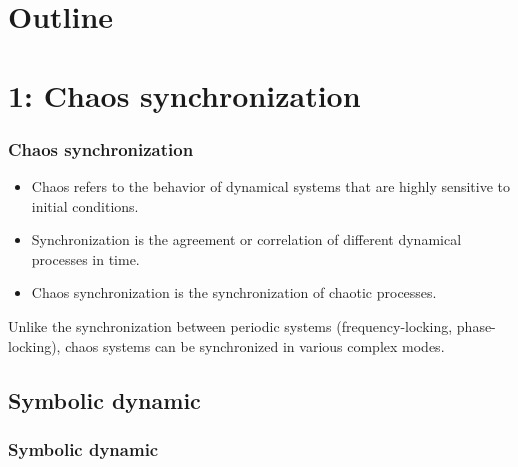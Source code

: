 \documentclass[14pt,handout]{beamer}
\begin{document}
\begin{CJK}{UTF8}{gbsn}
\section*{Outline}
\begin{frame}[shrink] %
\vspace{1cm}
\tableofcontents
\end{frame}

\section{1: Chaos synchronization} %
\begin{frame} \frametitle{Chaos synchronization}
\begin{itemize} %
    \item Chaos refers to the behavior of dynamical systems that are highly sensitive to initial conditions.
    \item Synchronization is the agreement or correlation of different dynamical processes in time.
    \item Chaos synchronization is the synchronization of chaotic processes.
\end{itemize} %
\begin{block}{}
    Unlike the synchronization between periodic systems (frequency-locking, phase-locking), chaos systems can be synchronized in various complex modes.
\end{block}
\end{frame}

\subsection{Symbolic dynamic}
\begin{frame} \frametitle{Symbolic dynamic}
\end{frame}


\end{CJK}
\end{document}
